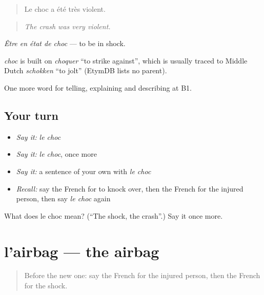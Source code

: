 \begin{quote}
Le choc a été très violent.
\end{quote}

\begin{quote}
\emph{The crash was very violent.}
\end{quote}

\emph{Être en état de choc} — to be in shock.

\begin{cousinweb}
\emph{choc} is built on \emph{choquer} \textquotedblleft{}to strike against\textquotedblright{}, which is usually traced to Middle Dutch \emph{schokken} \textquotedblleft{}to jolt\textquotedblright{} (EtymDB lists no parent).
\end{cousinweb}

\begin{grammarlens}[title={What you've built}]
One more word for telling, explaining and describing at B1.
\end{grammarlens}

\subsection*{Your turn}
\begin{itemize}
\raggedright
  \item \emph{Say it:} \emph{le choc}
  \item \emph{Say it:} \emph{le choc}, once more
  \item \emph{Say it:} a sentence of your own with \emph{le choc}
  \item \emph{Recall:} say the French for to knock over, then the French for the injured person, then say \emph{le choc} again
\end{itemize}

\begin{tcolorbox}[breakable,colback=teal!4,colframe=teal!35!black,title={Before you move on}]
What does le choc mean? (\textquotedblleft{}The shock, the crash\textquotedblright{}.) Say it once more.
\end{tcolorbox}
\section[l'airbag]{l'airbag — the airbag}

\label{lesson:FR-C298-airbag}



\begin{quote}
Before the new one: say the French for the injured person, then the French for the shock.
\end{quote}

